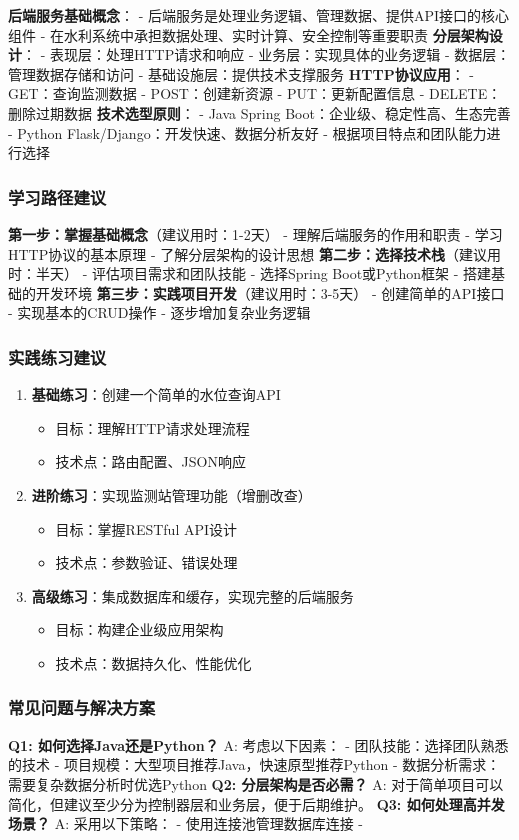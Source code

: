 \textbf{后端服务基础概念}： - 后端服务是处理业务逻辑、管理数据、提供API接口的核心组件 - 在水利系统中承担数据处理、实时计算、安全控制等重要职责 \textbf{分层架构设计}： - 表现层：处理HTTP请求和响应 - 业务层：实现具体的业务逻辑 - 数据层：管理数据存储和访问 - 基础设施层：提供技术支撑服务 \textbf{HTTP协议应用}： - GET：查询监测数据 - POST：创建新资源 - PUT：更新配置信息 - DELETE：删除过期数据 \textbf{技术选型原则}： - Java Spring Boot：企业级、稳定性高、生态完善 - Python Flask/Django：开发快速、数据分析友好 - 根据项目特点和团队能力进行选择 \subsubsection{学习路径建议}\label{ux5b66ux4e60ux8defux5f84ux5efaux8bae} \textbf{第一步：掌握基础概念}（建议用时：1-2天） - 理解后端服务的作用和职责 - 学习HTTP协议的基本原理 - 了解分层架构的设计思想 \textbf{第二步：选择技术栈}（建议用时：半天） - 评估项目需求和团队技能 - 选择Spring Boot或Python框架 - 搭建基础的开发环境 \textbf{第三步：实践项目开发}（建议用时：3-5天） - 创建简单的API接口 - 实现基本的CRUD操作 - 逐步增加复杂业务逻辑 \subsubsection{实践练习建议}\label{ux5b9eux8df5ux7ec3ux4e60ux5efaux8bae} \begin{enumerate} \def\labelenumi{\arabic{enumi}.} \item \textbf{基础练习}：创建一个简单的水位查询API \begin{itemize} \item 目标：理解HTTP请求处理流程 \item 技术点：路由配置、JSON响应 \end{itemize} \item \textbf{进阶练习}：实现监测站管理功能（增删改查） \begin{itemize} \item 目标：掌握RESTful API设计 \item 技术点：参数验证、错误处理 \end{itemize} \item \textbf{高级练习}：集成数据库和缓存，实现完整的后端服务 \begin{itemize} \item 目标：构建企业级应用架构 \item 技术点：数据持久化、性能优化 \end{itemize} \end{enumerate} \subsubsection{常见问题与解决方案}\label{ux5e38ux89c1ux95eeux9898ux4e0eux89e3ux51b3ux65b9ux6848} \textbf{Q1: 如何选择Java还是Python？} A: 考虑以下因素： - 团队技能：选择团队熟悉的技术 - 项目规模：大型项目推荐Java，快速原型推荐Python - 数据分析需求：需要复杂数据分析时优选Python \textbf{Q2: 分层架构是否必需？} A: 对于简单项目可以简化，但建议至少分为控制器层和业务层，便于后期维护。 \textbf{Q3: 如何处理高并发场景？} A: 采用以下策略： - 使用连接池管理数据库连接 - 